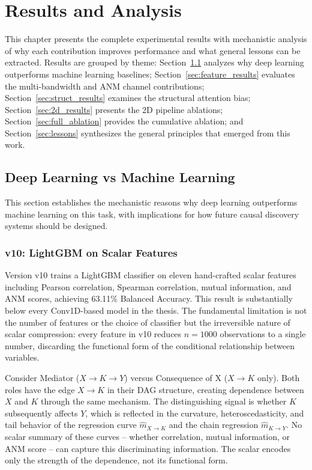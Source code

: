\chapter{Results and Analysis}
\label{chap:results}

This chapter presents the complete experimental results with mechanistic analysis of why each contribution improves performance and what general lessons can be extracted. Results are grouped by theme: Section~\ref{sec:dlvsml} analyzes why deep learning outperforms machine learning baselines; Section~\ref{sec:feature_results} evaluates the multi-bandwidth and ANM channel contributions; Section~\ref{sec:struct_results} examines the structural attention bias; Section~\ref{sec:2d_results} presents the 2D pipeline ablations; Section~\ref{sec:full_ablation} provides the cumulative ablation; and Section~\ref{sec:lessons} synthesizes the general principles that emerged from this work.

\section{Deep Learning vs Machine Learning}
\label{sec:dlvsml}

This section establishes the mechanistic reasons why deep learning outperforms machine learning on this task, with implications for how future causal discovery systems should be designed.

\subsection{v10: LightGBM on Scalar Features}

Version v10 trains a LightGBM classifier on eleven hand-crafted scalar features including Pearson correlation, Spearman correlation, mutual information, and ANM scores, achieving 63.11\% Balanced Accuracy. This result is substantially below every Conv1D-based model in the thesis. The fundamental limitation is not the number of features or the choice of classifier but the irreversible nature of scalar compression: every feature in v10 reduces $n = 1000$ observations to a single number, discarding the functional form of the conditional relationship between variables.

Consider Mediator ($X \to K \to Y$) versus Consequence of X ($X \to K$ only). Both roles have the edge $X \to K$ in their DAG structure, creating dependence between $X$ and $K$ through the same mechanism. The distinguishing signal is whether $K$ subsequently affects $Y$, which is reflected in the curvature, heteroscedasticity, and tail behavior of the regression curve $\hat{m}_{X \to K}$ and the chain regression $\hat{m}_{K \to Y}$. No scalar summary of these curves -- whether correlation, mutual information, or ANM score -- can capture this discriminating information. The scalar encodes only the strength of the dependence, not its functional form.

